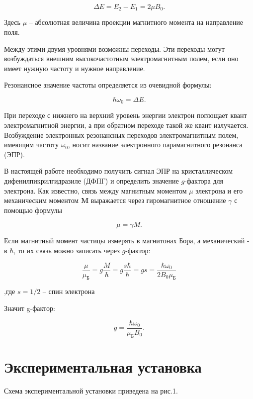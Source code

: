 \documentclass[a4paper,12pt]{article}
\begin{document}
\[	\Delta E = E_2 - E_1 = 2\mu B_0.\]
		
	Здесь $\mu$ -- абсолютная величина проекции магнитного момента на направление поля.
	
	Между этими двумя уровнями возможны переходы. Эти переходы могут возбуждаться внешним высокочастотным электромагнитным полем, если оно имеет нужную частоту и нужное направление.
	
	Резонансное значение частоты определяется из очевидной формулы:

  \[	\hbar \omega_0 = \Delta E.\]

	При переходе с нижнего на верхний уровень энергии электрон поглощает квант электромагнитной энергии, а при обратном переходе такой же квант излучается. Возбуждение электронных резонансных переходов электромагнитным полем, имеющим частоту $\omega_0$, носит название электронного парамагнитного резонанса (ЭПР).
	
	В настоящей работе необходимо получить сигнал ЭПР на кристаллическом дифенилпикрилгидразиле (ДФПГ) и определить значение $g$-фактора для электрона. Как известно, связь между магнитным моментом $\mu$ электрона и его механическим моментом $\mathbf{M}$ выражается через гиромагнитное отношение $\gamma$ с помощью формулы

   \[ \mu = \gamma M.\]

	Если магнитный момент частицы измерять в магнитонах Бора, а механический - в $\hbar$, то их связь можно записать через $g$-фактор:

	 \[ \frac{\mu}{\mu_\text{Б}} = g \frac{M}{\hbar} = g \frac{s\hbar}{\hbar} = gs = \frac{\hbar \omega_0}{2 B_0 \mu_\text{Б}}\]

,где $s = 1/2$ -- спин электрона

 
 
	Значит g-фактор:

	\[	g = \frac{\hbar \omega_0}{\mu_\text{Б} B_0}.\]
	

\section{Экспериментальная установка} 
   
   
Схема экспериментальной установки приведена на рис.1.
\end{document}

